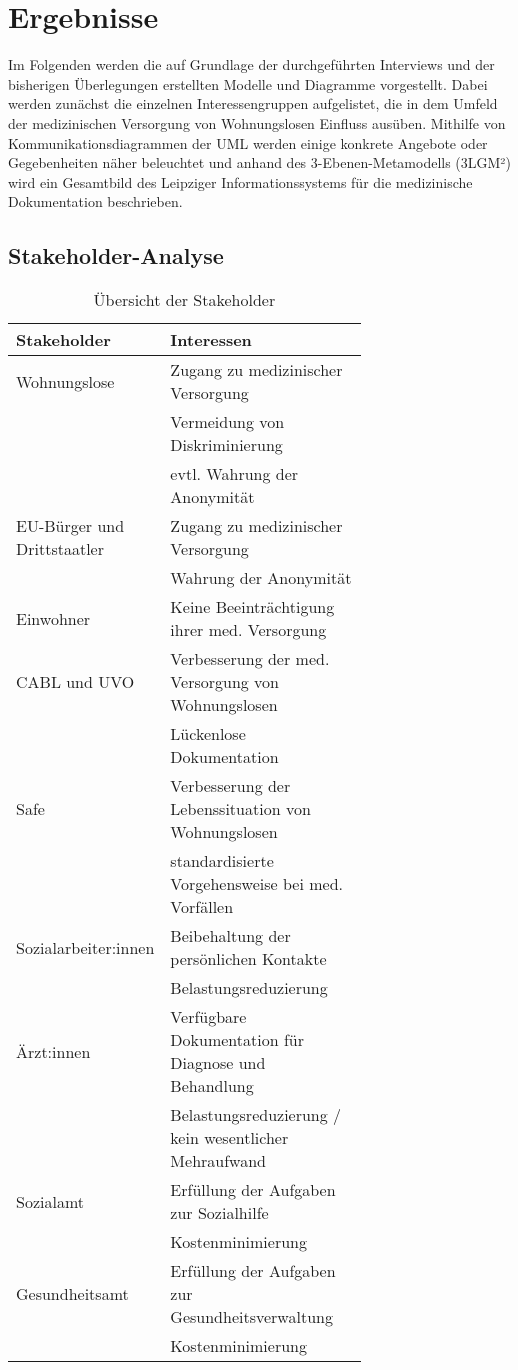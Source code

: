 \chapter{Ergebnisse}\label{ch:results}

Im Folgenden werden die auf Grundlage der durchgeführten Interviews und der bisherigen Überlegungen erstellten Modelle und Diagramme vorgestellt. Dabei werden zunächst die einzelnen Interessengruppen aufgelistet, die in dem Umfeld der medizinischen Versorgung von Wohnungslosen Einfluss ausüben. Mithilfe von Kommunikationsdiagrammen der \ac{UML} werden einige konkrete Angebote oder Gegebenheiten näher beleuchtet und anhand des 3-Ebenen-Metamodells (\acs{3LGM²}) wird ein Gesamtbild des Leipziger Informationssystems für die medizinische Dokumentation beschrieben.

\section{Stakeholder-Analyse}

\begin{table}[ht]
	\centering
	\begin{tabulary}{\textwidth}{Lp{0.7\linewidth}}
		\toprule
		Stakeholder&				Interessen\\
		\midrule
		Wohnungslose&				Zugang zu medizinischer Versorgung\\
		&							Vermeidung von Diskriminierung\\
		&							evtl. Wahrung der Anonymität\\
		EU-Bürger und Drittstaatler&Zugang zu medizinischer Versorgung\\
		&							Wahrung der Anonymität\\
		Einwohner&					Keine Beeinträchtigung ihrer med. Versorgung\\
		CABL und UVO&				Verbesserung der med. Versorgung von Wohnungslosen\\
		&							Lückenlose Dokumentation\\
		Safe&						Verbesserung der Lebenssituation von Wohnungslosen\\
		&							standardisierte Vorgehensweise bei med. Vorfällen\\
		Sozialarbeiter:innen&		Beibehaltung der persönlichen Kontakte\\
		&							Belastungsreduzierung\\
		Ärzt:innen&					Verfügbare Dokumentation für Diagnose und Behandlung\\
		&							Belastungsreduzierung / kein wesentlicher Mehraufwand\\
		Sozialamt&					Erfüllung der Aufgaben zur Sozialhilfe\\
		&							Kostenminimierung\\
		Gesundheitsamt&				Erfüllung der Aufgaben zur Gesundheitsverwaltung\\
		&							Kostenminimierung\\
		\bottomrule
	\end{tabulary}
	\caption[Stakeholder]{Übersicht der Stakeholder}
	\label{tab:stakeholder}
\end{table}


